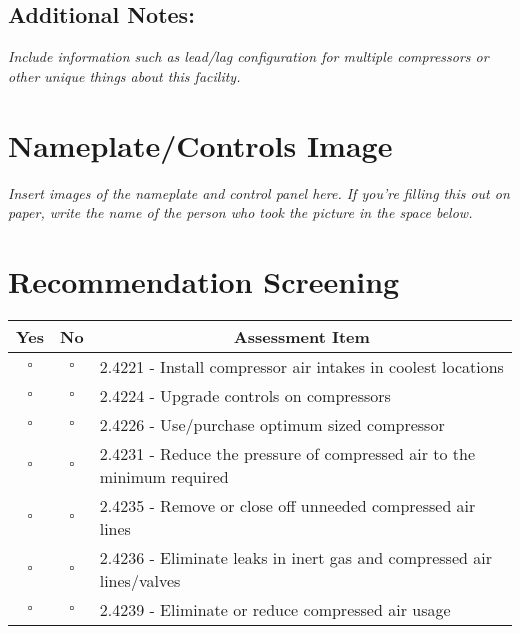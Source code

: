 \documentclass[./main.tex]{subfiles}
\begin{document}
\subsection*{Additional Notes:}
\emph{Include information such as lead/lag configuration for multiple compressors or other unique things about this facility. }
\vspace{4cm}

\clearpage \section*{Nameplate/Controls Image}
\emph{Insert images of the nameplate and control panel here. If you're filling this out on paper, write the name of the person who took the picture in the space below. }

\vspace{12cm}


\section*{Recommendation Screening}
\begin{tabular}{|c|c|p{13.5cm}|}
\hline
\multicolumn{1}{|c|}{\textbf{Yes}} & \multicolumn{1}{c|}{\textbf{No}} & \multicolumn{1}{c|}{\textbf{Assessment Item}} \\
\hline
$\square$ & $\square$ & 2.4221 - Install compressor air intakes in coolest locations \\ \hline
$\square$ & $\square$ & 2.4224 - Upgrade controls on compressors \\ \hline
$\square$ & $\square$ & 2.4226 - Use/purchase optimum sized compressor \\ \hline
$\square$ & $\square$ & 2.4231 - Reduce the pressure of compressed air to the minimum required \\ \hline
$\square$ & $\square$ & 2.4235 - Remove or close off unneeded compressed air lines \\ \hline
$\square$ & $\square$ & 2.4236 - Eliminate leaks in inert gas and compressed air lines/valves \\ \hline
$\square$ & $\square$ & 2.4239 - Eliminate or reduce compressed air usage \\ \hline
\end{tabular}





\end{document}
